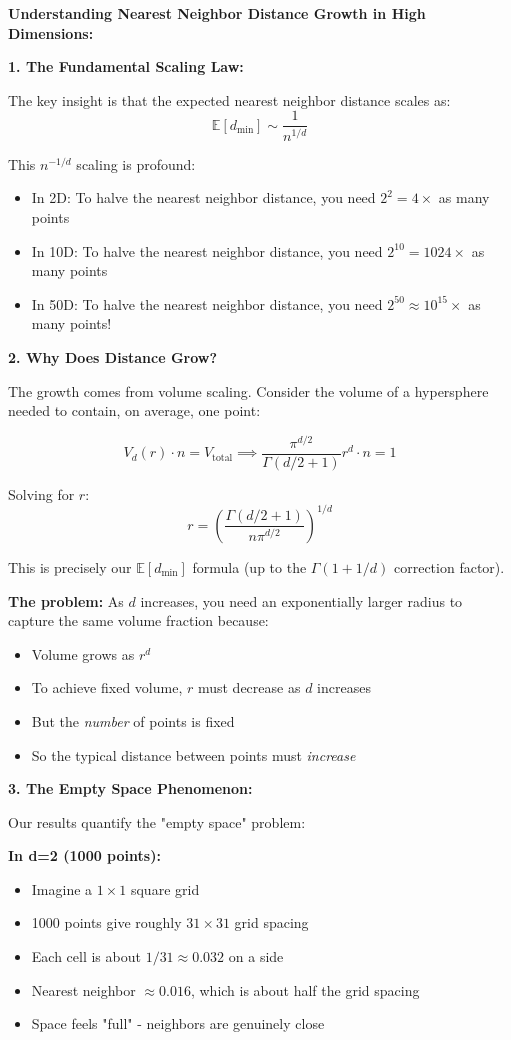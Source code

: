 \documentclass[12pt]{article}
\begin{document}
\begin{explanation}
\textbf{Understanding Nearest Neighbor Distance Growth in High Dimensions:}

\textbf{1. The Fundamental Scaling Law:}

The key insight is that the expected nearest neighbor distance scales as:
\[
\mathbb{E}[d_{\min}] \sim \frac{1}{n^{1/d}}
\]

This \(n^{-1/d}\) scaling is profound:

\begin{itemize}
    \item In 2D: To halve the nearest neighbor distance, you need \(2^2 = 4\times\) as many points
    \item In 10D: To halve the nearest neighbor distance, you need \(2^{10} = 1024\times\) as many points
    \item In 50D: To halve the nearest neighbor distance, you need \(2^{50} \approx 10^{15}\times\) as many points!
\end{itemize}

\textbf{2. Why Does Distance Grow?}

The growth comes from volume scaling. Consider the volume of a hypersphere needed to contain, on average, one point:

\[
V_d(r) \cdot n = V_{\text{total}} \implies \frac{\pi^{d/2}}{\Gamma(d/2 + 1)} r^d \cdot n = 1
\]

Solving for \(r\):
\[
r = \left(\frac{\Gamma(d/2 + 1)}{n \pi^{d/2}}\right)^{1/d}
\]

This is precisely our \(\mathbb{E}[d_{\min}]\) formula (up to the \(\Gamma(1 + 1/d)\) correction factor).

\textbf{The problem:} As \(d\) increases, you need an exponentially larger radius to capture the same volume fraction because:
\begin{itemize}
    \item Volume grows as \(r^d\)
    \item To achieve fixed volume, \(r\) must decrease as \(d\) increases
    \item But the \textit{number} of points is fixed
    \item So the typical distance between points must \textit{increase}
\end{itemize}

\textbf{3. The Empty Space Phenomenon:}

Our results quantify the "empty space" problem:

\textbf{In d=2 (1000 points):}
\begin{itemize}
    \item Imagine a $1\times1$ square grid
    \item 1000 points give roughly $31\times31$ grid spacing
    \item Each cell is about \(1/31 \approx 0.032\) on a side
    \item Nearest neighbor $\approx 0.016$, which is about half the grid spacing
    \item Space feels "full" - neighbors are genuinely close
\end{itemize}


\end{explanation}
\end{document}
